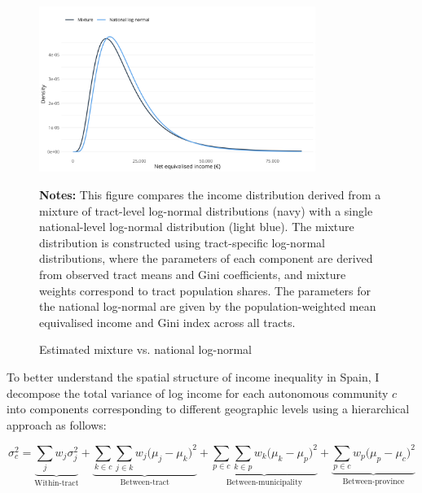 \begin{figure}[H]
\begin{center}
\captionsetup{justification=centering}
\caption{Estimated mixture vs. national log-normal}\label{fig:dist2}
\includegraphics[width=0.8\textwidth]{output/tract_vs_national_income_distribution.png}
\end{center}
\begin{fignotes2}
\textbf{Notes:} This figure compares the income distribution derived from a mixture of tract-level log-normal distributions (navy) with a single national-level log-normal distribution (light blue). The mixture distribution is constructed using tract-specific log-normal distributions, where the parameters of each component are derived from observed tract means and Gini coefficients, and mixture weights correspond to tract population shares. The parameters for the national log-normal are given by the population-weighted mean equivalised income and Gini index across all tracts.
\end{fignotes2}
\end{figure}

To better understand the spatial structure of income inequality in Spain, I decompose the total variance of log income for each autonomous community $c$ into components corresponding to different geographic levels using a hierarchical approach as follows:

\begin{equation}
\sigma^2_{c} = 
\underbrace{\sum_{j} w_j \sigma^2_{j}}_{\text{Within-tract}} + 
\underbrace{\sum_{k \in c} \sum_{j \in k} w_j \big( \mu_{j} - \mu_{k} \big)^2}_{\text{Between-tract}} + 
\underbrace{\sum_{p \in c} \sum_{k \in p} w_k \big( \mu_{k} - \mu_{p} \big)^2}_{\text{Between-municipality}} + 
\underbrace{\sum_{p \in c} w_p \big( \mu_{p} - \mu_{c} \big)^2}_{\text{Between-province}}
\end{equation}

